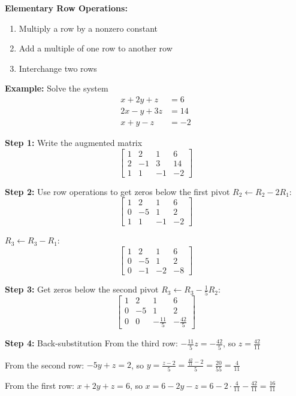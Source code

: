 \documentclass[12pt]{article}
\begin{document}
\textbf{Elementary Row Operations:}
\begin{enumerate}
\item Multiply a row by a nonzero constant
\item Add a multiple of one row to another row
\item Interchange two rows
\end{enumerate}

\textbf{Example:} Solve the system
\begin{align}
x + 2y + z &= 6 \\
2x - y + 3z &= 14 \\
x + y - z &= -2
\end{align}

\textbf{Step 1:} Write the augmented matrix
$$\left[\begin{array}{ccc|c}
1 & 2 & 1 & 6 \\
2 & -1 & 3 & 14 \\
1 & 1 & -1 & -2
\end{array}\right]$$

\textbf{Step 2:} Use row operations to get zeros below the first pivot
$R_2 \leftarrow R_2 - 2R_1$: 
$$\left[\begin{array}{ccc|c}
1 & 2 & 1 & 6 \\
0 & -5 & 1 & 2 \\
1 & 1 & -1 & -2
\end{array}\right]$$

$R_3 \leftarrow R_3 - R_1$:
$$\left[\begin{array}{ccc|c}
1 & 2 & 1 & 6 \\
0 & -5 & 1 & 2 \\
0 & -1 & -2 & -8
\end{array}\right]$$

\textbf{Step 3:} Get zeros below the second pivot
$R_3 \leftarrow R_3 - \frac{1}{5}R_2$:
$$\left[\begin{array}{ccc|c}
1 & 2 & 1 & 6 \\
0 & -5 & 1 & 2 \\
0 & 0 & -\frac{11}{5} & -\frac{42}{5}
\end{array}\right]$$

\textbf{Step 4:} Back-substitution
From the third row: $-\frac{11}{5}z = -\frac{42}{5}$, so $z = \frac{42}{11}$

From the second row: $-5y + z = 2$, so $y = \frac{z - 2}{5} = \frac{\frac{42}{11} - 2}{5} = \frac{20}{55} = \frac{4}{11}$

From the first row: $x + 2y + z = 6$, so $x = 6 - 2y - z = 6 - 2 \cdot \frac{4}{11} - \frac{42}{11} = \frac{16}{11}$
\end{document}
